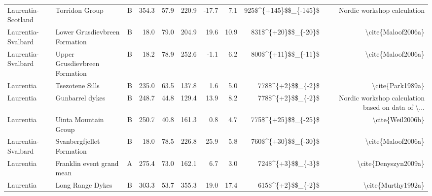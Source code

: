 \begin{longtable}{p{1 in}p{1 in}rrrrrrrr}
            Laurentia-Scotland &                                   Torridon Group &      B &     354.3 &      57.9 & 220.9 & -17.7 &       7.1 &  925\$\textasciicircum \{+145\}\$\$\_\{-145\}\$ &                        Nordic workshop calculation \\
            Laurentia-Svalbard &                    Lower Grusdievbreen Formation &      B &      18.0 &      79.0 & 204.9 &  19.6 &      10.9 &    831\$\textasciicircum \{+20\}\$\$\_\{-20\}\$ &                                 \textbackslash cite\{Maloof2006a\} \\
            Laurentia-Svalbard &                    Upper Grusdievbreen Formation &      B &      18.2 &      78.9 & 252.6 &  -1.1 &       6.2 &    800\$\textasciicircum \{+11\}\$\$\_\{-11\}\$ &                                 \textbackslash cite\{Maloof2006a\} \\
                     Laurentia &                                  Tsezotene Sills &      B &     235.0 &      63.5 & 137.8 &   1.6 &       5.0 &      778\$\textasciicircum \{+2\}\$\$\_\{-2\}\$ &                                   \textbackslash cite\{Park1989a\} \\
                     Laurentia &                                  Gunbarrel dykes &      B &     248.7 &      44.8 & 129.4 &  13.9 &       8.2 &      778\$\textasciicircum \{+2\}\$\$\_\{-2\}\$ &  Nordic workshop calculation based on data of \textbackslash ... \\
                     Laurentia &                             Uinta Mountain Group &      B &     250.7 &      40.8 & 161.3 &   0.8 &       4.7 &    775\$\textasciicircum \{+25\}\$\$\_\{-25\}\$ &                                   \textbackslash cite\{Weil2006b\} \\
            Laurentia-Svalbard &                        Svanbergfjellet Formation &      B &      18.0 &      78.5 & 226.8 &  25.9 &       5.8 &    760\$\textasciicircum \{+30\}\$\$\_\{-30\}\$ &                                 \textbackslash cite\{Maloof2006a\} \\
                     Laurentia &                        Franklin event grand mean &      A &     275.4 &      73.0 & 162.1 &   6.7 &       3.0 &      724\$\textasciicircum \{+3\}\$\$\_\{-3\}\$ &                               \textbackslash cite\{Denyszyn2009a\} \\
                     Laurentia &                                 Long Range Dykes &      B &     303.3 &      53.7 & 355.3 &  19.0 &      17.4 &      615\$\textasciicircum \{+2\}\$\$\_\{-2\}\$ &                                 \textbackslash cite\{Murthy1992a\} \\

\end{longtable}
